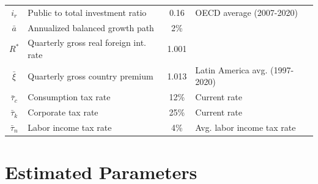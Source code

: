 \documentclass[12pt]{article}
\begin{document}
\begin{table}
\begin{footnotesize}
\begin{center}
\begin{tabular}{c l c l}
        $i_r$ & Public to total investment ratio & 0.16 & OECD average (2007-2020) \\
        $\bar{a}$ & Annualized balanced growth path & 2\% & \citet{gonzalez2016como} \\
        $R^*$ & Quarterly gross real foreign int. rate & 1.001 & \citet{cbo2021projections} \\ 
        $\bar{\xi}$ & Quarterly gross country premium & 1.013 & Latin America avg. (1997-2020) \\ %
        $\bar{\tau}_c$ & Consumption tax rate & 12\% & Current rate \\
        $\bar{\tau}_k$ & Corporate tax rate & 25\% & Current rate \\
        $\bar{\tau}_n$ & Labor income tax rate & 4\% & Avg. labor income tax rate \\
        \hline
    \end{tabular}
\end{center}
\end{footnotesize}
\end{table}

\section{Estimated Parameters}\label{app:estimatedparameters}
\end{document}
